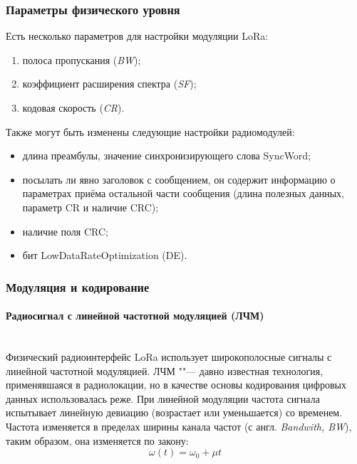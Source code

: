 \subsubsection{Параметры физического уровня} 

Есть несколько параметров для настройки модуляции LoRa: 
\begin{enumerate}
	\item полоса пропускания (\textit{BW}); 
	\item коэффициент расширения спектра (\textit{SF}); 
	\item кодовая скорость (\textit{CR}).
\end{enumerate}

Также могут быть изменены следующие настройки радиомодулей:
\begin{itemize}
	\item длина преамбулы, значение синхронизирующего слова SyncWord;
	\item посылать ли явно заголовок с сообщением, он содержит информацию о параметрах приёма остальной части сообщения (длина полезных данных, параметр CR и наличие CRC);
	\item наличие поля CRC;
	\item бит LowDataRateOptimization (DE).
\end{itemize}

\subsubsection{Модуляция и кодирование}

\paragraph{Радиосигнал с линейной частотной модуляцией (ЛЧМ)} \hspace{0pt}\\

Физический радиоинтерфейс LoRa использует широкополосные сигналы с линейной частотной модуляцией\cite{augustin2016}. 
ЛЧМ ""--- давно известная технология, применявшаяся в радиолокации, но в качестве основы кодирования цифровых данных использовалась реже.
При линейной модуляции частота сигнала испытывает линейную девиацию (возрастает или уменьшается) со временем. 
Частота изменяется в пределах ширины канала частот (с англ. \textit{Bandwith, BW}), таким образом, она изменяется по закону:
\begin{equation}
	\omega(t) = \omega_0 + \mu t
\end{equation}

